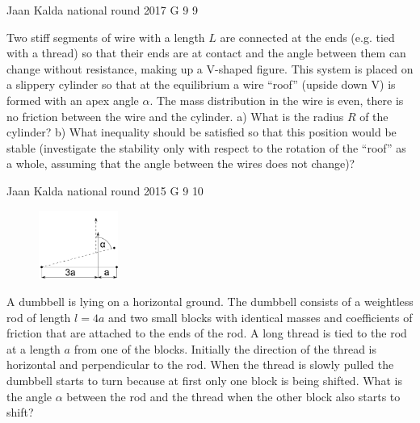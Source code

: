 \documentclass[11pt]{article}
\begin{document}
{Jaan Kalda} %
{national round} %
{2017} %
{G 9} %
{9} %
{

\ifEngStatement
Two stiff segments of wire with a length $L$ are connected at the ends (e.g. tied with a thread) so that their ends are at contact and the angle between them can change without resistance, making up a V-shaped figure. This system is placed on a slippery cylinder so that at the equilibrium a wire “roof” (upside down V) is formed with an apex angle $\alpha$. The mass distribution in the wire is even, there is no friction between the wire and the cylinder. a) What is the radius $R$ of the cylinder? b) What inequality should be satisfied so that this position would be stable (investigate the stability only with respect to the rotation of the “roof” as a whole, assuming that the angle between the wires does not change)?
\fi
}

{Jaan Kalda} %
{national round} %
{2015} %
{G 9} %
{10} %
{

\ifEngStatement
\begin{figure}%
\vspace{-5 pt}%
\includegraphics[width=0.23\textwidth]{2015-v3g-09-hantel}%
\vspace{-15 pt}%
\end{figure}
A dumbbell is lying on a horizontal ground. The dumbbell consists of a weightless rod of length $l=4a$ and two small blocks with identical masses and coefficients of friction that are attached to the ends of the rod. A long thread is tied to the rod at a length $a$ from one of the blocks. Initially the direction of the thread is horizontal and perpendicular to the rod. When the thread is slowly pulled the dumbbell starts to turn because at first only one block is being shifted. What is the angle $\alpha$ between the rod and the thread when the other block also starts to shift?
\fi
}
\newpage\subsection{\protect{}}
\end{document}
